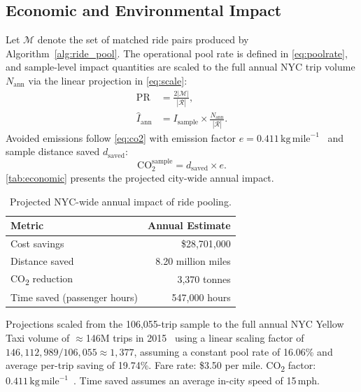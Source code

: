 \documentclass[a4paper,fleqn]{cas-dc}
\begin{document}
\subsection{Economic and Environmental Impact}

Let $\mathcal{M}$ denote the set of matched ride pairs produced by Algorithm~\ref{alg:ride_pool}.  The operational pool rate is defined in \eqref{eq:poolrate}, and sample-level impact quantities are scaled to the full annual NYC trip volume $N_{\mathrm{ann}}$ via the linear projection in \eqref{eq:scale}:
\begin{align}
  \mathrm{PR}
  &= \frac{2|\mathcal{M}|}{|\mathcal{R}|},
  \label{eq:poolrate} \\
  \widehat{I}_{\mathrm{ann}}
  &= I_{\mathrm{sample}}
  \times \frac{N_{\mathrm{ann}}}{|\mathcal{R}|}.
  \label{eq:scale}
\end{align}
Avoided emissions follow \eqref{eq:co2} with emission factor $e{=}0.411\,\mathrm{kg\,mile}^{-1}$~\cite{epa_emission_factors} and sample distance saved $d_{\mathrm{saved}}$:
\begin{equation}
  \mathrm{CO}_{2}^{\mathrm{sample}} = d_{\mathrm{saved}} \times e.
  \label{eq:co2}
\end{equation}
\autoref{tab:economic} presents the projected city-wide annual impact.
\begin{table}[!htb]
\centering
\caption{Projected NYC-wide annual impact of ride pooling.\label{tab:economic}}
\begin{threeparttable}
\begin{tabularx}{\columnwidth}{>{\raggedright\arraybackslash}X r}
\toprule
\textbf{Metric} & \textbf{Annual Estimate} \\
\midrule
Cost savings                  & \$28,701,000 \\
Distance saved                & 8.20 million miles \\
CO\textsubscript{2} reduction & 3,370 tonnes \\
Time saved (passenger hours)  & 547,000 hours \\
\bottomrule
\end{tabularx}
\begin{tablenotes}
  \small
  \item Projections scaled from the 106,055-trip sample to the full annual NYC Yellow Taxi volume of $\approx$146M trips in 2015~\cite{nyc_opendata_2015,tlc_annual_2015} using a linear scaling factor of $146{,}112{,}989 / 106{,}055 \approx 1{,}377$, assuming a constant pool rate of 16.06\% and average per-trip saving of 19.74\%. Fare rate: \$3.50 per mile. CO\textsubscript{2} factor: $0.411\,\mathrm{kg\,mile}^{-1}$~\cite{epa_emission_factors}. Time saved assumes an average in-city speed of 15\,mph.
\end{tablenotes}
\end{threeparttable}
\end{table}
\end{document}
